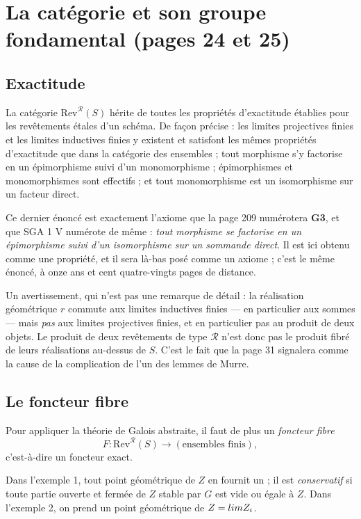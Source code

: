 \documentclass[11pt,a4paper]{article}
\begin{document}
\section*{La catégorie et son groupe fondamental (pages 24 et 25)}

\subsection*{Exactitude}

La catégorie $\mathrm{Rev}^{\mathcal{R}}(S)$ hérite de toutes les propriétés
d'exactitude établies pour les revêtements étales d'un schéma. De façon
précise : les limites projectives finies et les limites inductives finies y
existent et satisfont les mêmes propriétés d'exactitude que dans la catégorie
des ensembles ; tout morphisme s'y factorise en un épimorphisme suivi d'un
monomorphisme ; épimorphismes et monomorphismes sont effectifs ; et tout
monomorphisme est un isomorphisme sur un facteur direct.

Ce dernier énoncé est exactement l'axiome que la page 209 numérotera
\textbf{G3}, et que SGA 1 V numérote de même : \emph{tout morphisme se
factorise en un épimorphisme suivi d'un isomorphisme sur un sommande direct}.
Il est ici obtenu comme une propriété, et il sera là-bas posé comme un axiome ;
c'est le même énoncé, à onze ans et cent quatre-vingts pages de distance.

Un avertissement, qui n'est pas une remarque de détail : la réalisation
géométrique $r$ commute aux limites inductives finies --- en particulier aux
sommes --- mais \emph{pas} aux limites projectives finies, et en particulier
pas au produit de deux objets. Le produit de deux revêtements de type
$\mathcal{R}$ n'est donc pas le produit fibré de leurs réalisations au-dessus
de $S$. C'est le fait que la page 31 signalera comme la cause de la
complication de l'un des lemmes de Murre.

\subsection*{Le foncteur fibre}

Pour appliquer la théorie de Galois abstraite, il faut de plus un
\emph{foncteur fibre}
\[
  F : \mathrm{Rev}^{\mathcal{R}}(S) \longrightarrow (\text{ensembles finis}) ,
\]
c'est-à-dire un foncteur exact.

Dans l'exemple 1, tout point géométrique de $Z$ en fournit un ; il est
\emph{conservatif} si toute partie ouverte et fermée de $Z$ stable par $G$ est
vide ou égale à $Z$. Dans l'exemple 2, on prend un point géométrique de
$Z = \varprojlim Z_{i}$.
\end{document}
